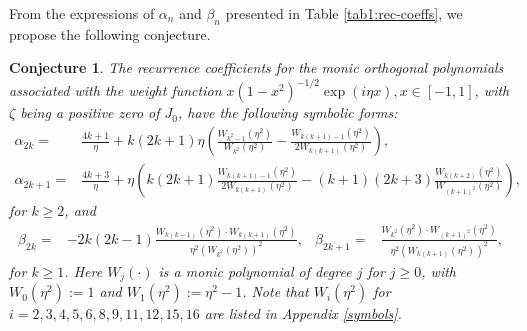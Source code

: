 \documentclass[11pt,a4paper]{article}
\newtheorem{conjecture}[theorem]{Conjecture}
\numberwithin{equation}{section}
\begin{document}
From the expressions of $\alpha_n$ and $\beta_n$ presented in Table \ref{tab1:rec-coeffs}, we propose the following conjecture.
\begin{conjecture} The recurrence coefficients for the monic orthogonal polynomials associated with the weight function $x(1-x^2)^{-1/2}\exp(i\eta x), x\in[-1,1]$, with $\zeta$ being a positive zero of $J_{0}$, have the following symbolic forms:
\begin{align*}
\alpha_{2k}=&\frac{4k+1}{\eta}+k(2k+1)\eta\left(\frac{W_{k^2-1}(\eta^2)}{W_{k^2}(\eta^2)}-\frac{W_{k(k+1)-1}(\eta^2)}{2W_{k(k+1)}(\eta^2)}\right),\\ \alpha_{2k+1}=&\frac{4k+3}{\eta}+\eta\left(k(2k+1)\frac{W_{k(k+1)-1}(\eta^2)}{2W_{k(k+1)}(\eta^2)}-(k+1)(2k+3)\frac{W_{k(k+2)}(\eta^2)}{W_{(k+1)^2}(\eta^2)}\right),
\end{align*}
for $k\geq2$, and
\begin{align*}
\beta_{2k} =& -2k(2k-1)\frac{W_{k(k-1)}(\eta^2)\cdot W_{k(k+1)}(\eta^2)}{\eta^2 \left(W_{k^2}(\eta^2)\right)^2},& \beta_{2k+1} =& \frac{W_{k^2}(\eta^2)\cdot W_{(k+1)^2}(\eta^2)}{\eta^2 \left(W_{k(k+1)}(\eta^2)\right)^2},
\end{align*}
for $k\geq1$. Here $W_j(\cdot)$ is a monic polynomial of degree $j$ for $j\geq0$, with $W_0(\eta^2):=1$ and $W_1(\eta^2):=\eta^2-1$. Note that $W_i(\eta^2)$ for $i=2,3,4,5,6,8,9,11,12,15,16$ are listed in Appendix \ref{symbols}.
\end{conjecture}
\end{document}
